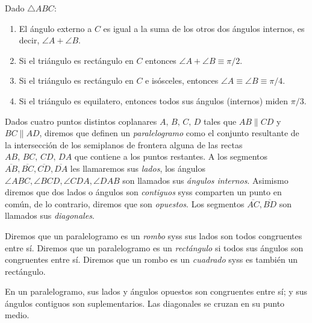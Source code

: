 \documentclass[11pt,a4paper]{book}
\begin{document}
\begin{cor}
Dado $\triangle ABC$:
	\begin{enumerate}
		\item El ángulo externo a $C$ es igual a la suma de los otros dos ángulos internos, es decir, $\angle A + \angle B$.
		\item Si el triángulo es rectángulo en $C$ entonces $\angle A + \angle B \equiv \pi/2$.
		\item Si el triángulo es rectángulo en $C$ e isósceles, entonces $\angle A \equiv \angle B \equiv \pi/4$.
		\item Si el triángulo es equilatero, entonces todos sus ángulos (internos) miden $\pi/3$.
	\end{enumerate}
\end{cor}
\begin{mydef}[Paralelogramos]
Dados cuatro puntos distintos coplanares $A,\,B,\,C,\,D$ tales que $AB\parallel CD$ y $BC\parallel AD$, diremos que definen un \textit{paralelogramo} como el conjunto resultante de la intersección de los semiplanos de frontera alguna de las rectas $AB,\, BC,\, CD,\, DA$ que contiene a los puntos restantes. A los segmentos $\overline{AB}, \overline{BC}, \overline{CD}, \overline{DA}$ les llamaremos sus \textit{lados}, los ángulos $\angle ABC, \angle BCD, \angle CDA, \angle DAB$ son llamados sus \textit{ángulos internos}. Asimismo diremos que dos lados o ángulos son \textit{contiguos} syss comparten un punto en común, de lo contrario, diremos que son \textit{opuestos}. Los segmentos $\overline{AC}, \overline{BD}$ son llamados sus \textit{diagonales}.

Diremos que un paralelogramo es un \textit{rombo} syss sus lados son todos congruentes entre sí. Diremos que un paralelogramo es un \textit{rectángulo} si todos sus ángulos son congruentes entre sí. Diremos que un rombo es un \textit{cuadrado} syss es también un rectángulo.
\end{mydef}
\begin{thm}
En un paralelogramo, sus lados y ángulos opuestos son congruentes entre sí; y sus ángulos contiguos son suplementarios. Las diagonales se cruzan en su punto medio.
\end{thm}
\end{document}

